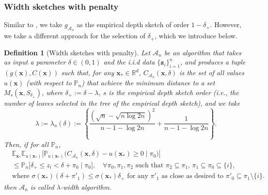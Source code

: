\documentclass{article} %
\newtheorem{definition}{Definition}[section]
\theoremstyle{remark}
\theoremstyle{definition}      %
\begin{document}
\subsubsection{Width sketches with penalty}
Similar to \citep{angelopoulos2024conformal}, we take $g_{\mathcal{A}_n}$ as the empirical depth sketch of order $1 - \delta_+$. 
However, we take a different approach for the selection of $\delta_+$, which we introduce below.
\begin{definition}[Width sketches with penalty] \label{eq:width_sketch_penalty}
  Let $\mathcal{A}_n$ be an algorithm that takes as input 
  a parameter $\delta \in (0,1)$ and the i.i.d data $\{ \bm z_i \}_{i=1}^n$, and produces a tuple $(g(\bm{x}),C(\bm{x}))$ such that, for any $\bm{x}_* \in \mathbb{R}^d$, $C_{\mathcal{A}_n}(\bm{x},\delta)$ is the set of all values $u(\bm{x})$ (with respect to $\mathbb{P}_n$) that achieve the minimum distance to a set $M_s(\bm{x},S_{\delta_+})$, where $\delta_+ := \delta - \lambda$, $s$ is the empirical depth sketch order (i.e., the number of leaves selected in the tree of the empirical depth sketch), and we take 
  \begin{equation} \label{eq:width_penalty}
    \lambda :=\lambda_n(\delta) := \left\{\frac{(\sqrt{n} - \sqrt{n \log 2n})^2}{n - 1 - \log 2n} + \frac{1}{n - 1 - \log 2n}\right\}.
  \end{equation}
  Then, if for all $\mathbb{P}_n$, 
  \begin{equation}
\begin{split} 
    &\mathbb{E}_{\bm{x}_*} \mathbb{E}_{u(\bm{x_*})}\Big[
        \mathbb{P}_{u(\bm{x_*})}\big(C_{\mathcal{A}_n}(\bm{x},\delta) - u(\bm{x_*}) \geq 0 \mid \pi_0\big)
    \Big] \\
    &\leq \mathbb{P}_n\Big[ \delta_+ \leq z_{i} < \delta + \pi_0 \mid \pi_0 \Big], 
    \quad \forall \pi_0, \pi_1, \pi_2 \text{ such that } \pi_2 \subseteq \pi_1, \, \pi_1 \subseteq \pi_0 \subseteq \{ i \}, \\
    &\text{where } \sigma(\bm{x_*}) (\delta + \pi'_1) \leq \sigma(\bm{x_*}) \delta_+ 
    \text{ for any } \pi'_1 \text{ as close as desired to } \pi'_0 \subseteq \pi_1 \setminus \{i\}.
\end{split} 
\end{equation}
  then $\mathcal{A}_n$ is called $\lambda$-width algorithm.
\end{definition}
\end{document}
